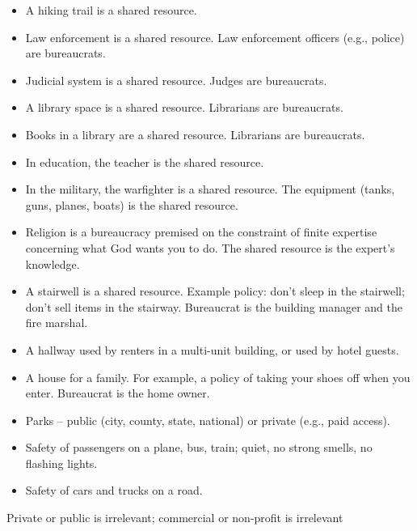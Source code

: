 {{\begin{itemize}
\item A hiking trail is a shared resource.
\item Law enforcement is a shared resource. Law enforcement officers (e.g., police) are bureaucrats. 
\item Judicial system is a shared resource. Judges are bureaucrats.
\item A library space is a shared resource. Librarians are bureaucrats.
\item Books in a library are a shared resource. Librarians are bureaucrats.
\item In education, the teacher is the shared resource. 
\item In the military, the warfighter is a shared resource. The equipment (tanks, guns, planes, boats) is the shared resource.
\item Religion is a bureaucracy premised on the constraint of finite expertise concerning what God wants you to do. The shared resource is the expert's knowledge.
\item A stairwell is a shared resource. Example policy: don't sleep in the stairwell; don't sell items in the stairway. Bureaucrat is the building manager and the fire marshal. 
\item A hallway used by renters in a multi-unit building, or used by hotel guests.
\item A house for a family. For example, a policy of taking your shoes off when you enter. Bureaucrat is the home owner.
\item Parks -- public (city, county, state, national) or private (e.g., paid access). 
\item Safety of passengers on a plane, bus, train; quiet, no strong smells, no flashing lights.
\item Safety of cars and trucks on a road. 
\end{itemize}
Private or public is irrelevant; commercial or non-profit is irrelevant}
}


